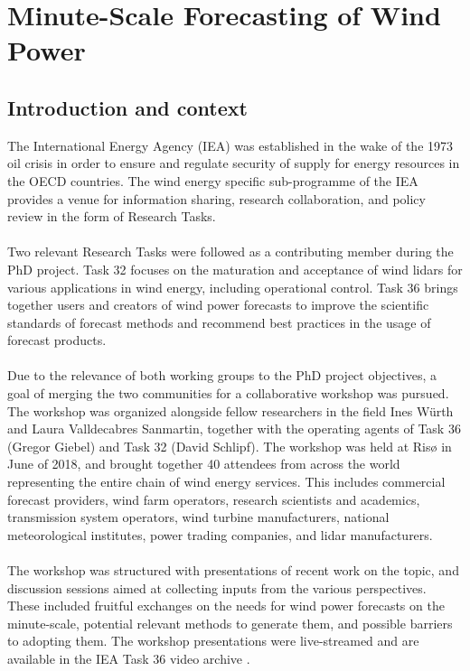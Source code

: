 \chapter{Minute-Scale Forecasting of Wind Power}


\clearpage
\section{Introduction and context}

The International Energy Agency (IEA) was established in the wake of the 1973 oil crisis in order to ensure and regulate security of supply for energy resources in the OECD countries. The wind energy specific sub-programme of the IEA provides a venue for information sharing, research collaboration, and policy review in the form of Research Tasks.
\\\\
Two relevant Research Tasks were followed as a contributing member during the PhD project.  Task 32 focuses on the maturation and acceptance of wind lidars for various applications in wind energy, including operational control. Task 36 brings together users and creators of wind power forecasts to improve the scientific standards of forecast methods and recommend best practices in the usage of forecast products.
\\\\
Due to the relevance of both working groups to the PhD project objectives, a goal of merging the two communities for a collaborative workshop was pursued. The workshop was organized alongside fellow researchers in the field Ines W\"urth and Laura Valldecabres Sanmartin, together with the operating agents of Task 36 (Gregor Giebel) and Task 32 (David Schlipf).
The workshop was held at Ris{\o} in June of 2018, and brought together 40 attendees from across the world representing the entire chain of wind energy services.  This includes commercial forecast providers, wind farm operators, research scientists and academics, transmission system operators, wind turbine manufacturers, national meteorological institutes, power trading companies, and lidar manufacturers. 
\\\\
The workshop was structured with presentations of recent work on the topic, and discussion sessions aimed at collecting inputs from the various perspectives. These included fruitful exchanges on the needs for wind power forecasts on the minute-scale, potential relevant methods to generate them, and possible barriers to adopting them. The workshop presentations were live-streamed and are available in the IEA Task 36 video archive \cite{IEA_youtube}.
